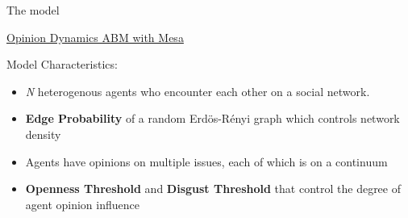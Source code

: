 \documentclass[12pt]{beamer}
\begin{document}
\begin{frame}[c]{The model}  %




\large

\centering
	\underline{Opinion Dynamics ABM with Mesa}

\vspace{.05in}
	Model Characteristics:
\vspace{-.15in}

\small
\begin{itemize}
\itemsep.1em
\item \textit{N} heterogenous agents who encounter each other on a social network.
\item \textbf{Edge Probability} of a random Erd\"{o}s-R\'{e}nyi graph which controls network density
\item Agents have opinions on multiple issues, each of which is on a continuum


\item \textbf{Openness Threshold} and \textbf{Disgust Threshold} that control the degree of agent opinion influence
\end{itemize}


\end{frame}
\end{document}
